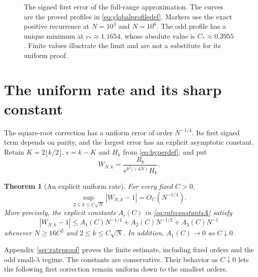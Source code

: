 \documentclass[11pt]{article}
\newtheorem{theorem}{Theorem}[section]
\theoremstyle{definition}
\theoremstyle{remark}
\newcommand{\1}{\mathbf 1}
\begin{document}
\begin{figure}[htbp]
\caption{The signed first error of the full-range approximation. The curves are the proved profiles in \eqref{eq:globalprofiledef}. Markers use the exact positive recurrence at $N=10^3$ and $N=10^6$. The odd profile has a unique minimum at $c_*\approx1.1654$, whose absolute value is $C_*\approx0.3955$. Finite values illustrate the limit and are not a substitute for its uniform proof.}
\label{fig:globalerror}
\end{figure}


\clearpage
\section{The uniform rate and its sharp constant}\label{sec:rates}

The square-root correction has a uniform error of order $N^{-1/4}$. Its first signed term depends on parity, and the largest error has an explicit asymptotic constant. Retain $K=2\lfloor k/2\rfloor$, $\epsilon=k-K$ and $H_k$ from \eqref{eq:hyperdef}, and put
\begin{equation}\label{eq:rateW}
W_{N,k}=\frac{R_k}{e^{k^2/(4N)}H_k}.
\end{equation}

\begin{theorem}[An explicit uniform rate]\label{thm:rate}
For every fixed $C>0$,
\begin{equation}\label{eq:uniformrate}
\sup_{2\le k\le C\sqrt N}|W_{N,k}-1|=O_C(N^{-1/4}).
\end{equation}
More precisely, the explicit constants $A_i(C)$ in \eqref{eq:rateconstantsA} satisfy
\begin{equation}\label{eq:ratefinite}
|W_{N,k}-1|
\le A_1(C)N^{-1/4}+A_2(C)N^{-1/2}+A_3(C)N^{-1}
\end{equation}
whenever $N\ge16C^2$ and $2\le k\le C\sqrt N$. In addition, $A_1(C)\to0$ as $C\downarrow0$.
\end{theorem}

Appendix~\ref{sec:rateproof} proves the finite estimate, including fixed orders and the odd small-$\lambda$ regime. The constants are conservative. Their behavior as $C\downarrow0$ lets the following first correction remain uniform down to the smallest orders.
\end{document}
